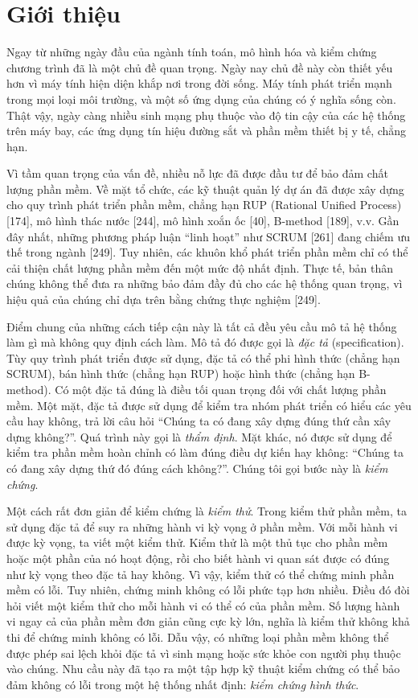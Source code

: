 \section{Giới thiệu}
Ngay từ những ngày đầu của ngành tính toán, mô hình hóa và kiểm chứng chương trình đã là một chủ đề quan trọng. Ngày nay chủ đề này còn thiết yếu hơn vì máy tính hiện diện khắp nơi trong đời sống. Máy tính phát triển mạnh trong mọi loại môi trường, và một số ứng dụng của chúng có ý nghĩa sống còn. Thật vậy, ngày càng nhiều sinh mạng phụ thuộc vào độ tin cậy của các hệ thống trên máy bay, các ứng dụng tín hiệu đường sắt và phần mềm thiết bị y tế, chẳng hạn.

Vì tầm quan trọng của vấn đề, nhiều nỗ lực đã được đầu tư để bảo đảm chất lượng phần mềm. Về mặt tổ chức, các kỹ thuật quản lý dự án đã được xây dựng cho quy trình phát triển phần mềm, chẳng hạn RUP (Rational Unified Process) [174], mô hình thác nước [244], mô hình xoắn ốc [40], B-method [189], v.v. Gần đây nhất, những phương pháp luận ``linh hoạt'' như SCRUM [261] đang chiếm ưu thế trong
ngành [249]. Tuy nhiên, các khuôn khổ phát triển phần mềm chỉ có thể cải thiện chất lượng phần mềm đến một mức độ nhất định. Thực tế, bản thân chúng không thể đưa ra những bảo đảm đầy đủ cho các hệ thống quan trọng, vì hiệu quả của chúng chỉ dựa trên bằng chứng thực nghiệm [249].

Điểm chung của những cách tiếp cận này là tất cả đều yêu cầu mô tả hệ thống làm gì mà không quy định cách làm. Mô tả đó được gọi là \emph{đặc tả} (specification). Tùy quy trình phát triển được sử dụng, đặc tả có thể phi hình thức (chẳng hạn SCRUM), bán hình thức (chẳng hạn RUP) hoặc hình thức (chẳng hạn B-method). Có một đặc tả đúng là điều tối quan trọng đối với chất lượng phần mềm. Một mặt, đặc tả được sử dụng để kiểm tra nhóm phát triển có hiểu các yêu cầu hay không, trả lời câu hỏi ``Chúng ta có đang xây dựng đúng thứ cần xây dựng không?''. Quá trình này gọi là \emph{thẩm định}. Mặt khác, nó được sử dụng để kiểm tra phần mềm hoàn chỉnh có làm đúng điều dự kiến hay không: ``Chúng ta có đang xây dựng thứ đó đúng cách không?''. Chúng tôi gọi bước này là \emph{kiểm chứng}.

Một cách rất đơn giản để kiểm chứng là \emph{kiểm thử}. Trong kiểm thử phần mềm, ta sử dụng đặc tả để suy ra những hành vi kỳ vọng ở phần mềm. Với mỗi hành vi được kỳ vọng, ta viết một kiểm thử. Kiểm thử là một thủ tục cho phần mềm hoặc một phần của nó hoạt động, rồi cho biết hành vi quan sát được có đúng như kỳ vọng theo đặc tả hay không. Vì vậy, kiểm thử có thể chứng minh phần mềm có lỗi. Tuy nhiên, chứng minh không có lỗi phức tạp hơn nhiều. Điều đó đòi hỏi viết một kiểm thử cho mỗi hành vi có thể có của phần mềm. Số lượng hành vi ngay cả của phần mềm đơn giản cũng cực kỳ lớn, nghĩa là kiểm thử không khả thi để chứng minh không có lỗi. Dẫu vậy, có những loại phần mềm không thể được phép sai lệch khỏi đặc tả vì sinh mạng hoặc sức khỏe con người phụ thuộc vào chúng. Nhu cầu này đã tạo ra một tập hợp kỹ thuật kiểm chứng có thể bảo đảm không có lỗi trong một hệ thống nhất định: \emph{kiểm chứng hình thức}.

